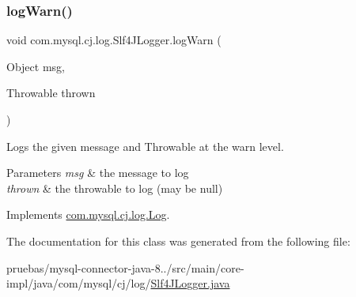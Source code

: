 \subsubsection{\texorpdfstring{log\+Warn()}{logWarn()}\hspace{0.1cm}{\footnotesize\ttfamily [2/2]}}
{\footnotesize\ttfamily void com.\+mysql.\+cj.\+log.\+Slf4\+J\+Logger.\+log\+Warn (\begin{DoxyParamCaption}\item[{Object}]{msg,  }\item[{Throwable}]{thrown }\end{DoxyParamCaption})}

Logs the given message and Throwable at the \textquotesingle{}warn\textquotesingle{} level.


\begin{DoxyParams}{Parameters}
{\em msg} & the message to log \\
\hline
{\em thrown} & the throwable to log (may be null) \\
\hline
\end{DoxyParams}


Implements \mbox{\hyperlink{interfacecom_1_1mysql_1_1cj_1_1log_1_1_log_a36af866ddfdda47938c768d3d0e68572}{com.\+mysql.\+cj.\+log.\+Log}}.



The documentation for this class was generated from the following file\+:\begin{DoxyCompactItemize}
\item 
pruebas/mysql-\/connector-\/java-\/8../src/main/core-\/impl/java/com/mysql/cj/log/\mbox{\hyperlink{_slf4_j_logger_8java}{Slf4\+J\+Logger.\+java}}\end{DoxyCompactItemize}
